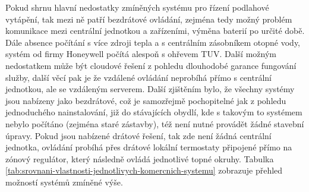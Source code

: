 Pokud shrnu hlavní nedostatky zmíněných systému pro řízení podlahové vytápění, tak mezi ně patří bezdrátové ovládání, zejména tedy možný problém komunikace mezi centrální jednotkou a zařízeními, výměna baterií po určité době. Dále absence počítání s více zdroji tepla a s centrálním zásobníkem otopné vody, systém od firmy Honeywell počítá alespoň s ohřevem TUV. Další možným nedostatkem může být cloudové řešení z pohledu dlouhodobé garance fungování služby, další věcí pak je že vzdálené ovládání neprobíhá přímo s centrální jednotkou, ale se vzdáleným serverem. Další zjištěním bylo, že všechny systémy jsou nabízeny jako bezdrátové, což je samozřejmě pochopitelné jak z pohledu jednoduchého nainstalování, již do stávajících obydlí, kde s takovým to systémem nebylo počítáno (zejména staré zástavby), též není nutné provádět žádné stavební úpravy. Pokud jsou nabízené drátové řešení, tak zde není žádná centrální jednotka, ovládání probíhá přes drátové lokální termostaty připojené přímo na zónový regulátor, který následně ovládá jednotlivé topné okruhy. Tabulka \ref{tab:srovnani-vlastnosti-jednotlivych-komercnich-systemu} zobrazuje přehled možností systémů zmíněné výše.


